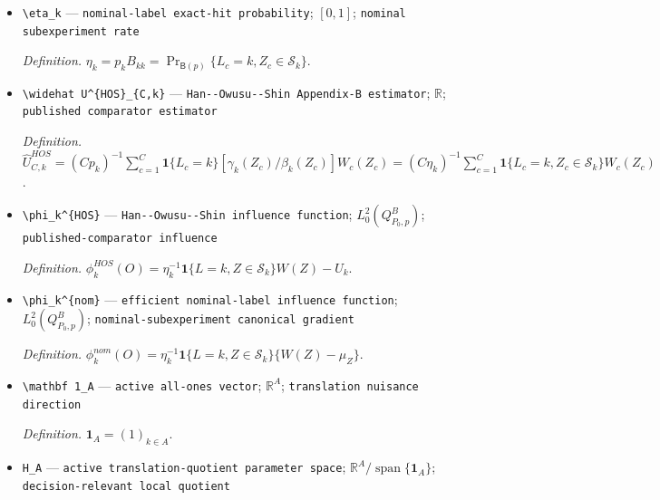 \documentclass{article}
\begin{document}
\begin{itemize}
  \par\smallskip\noindent\emph{Definition.} \(\beta_k(z)=\pi_k^{\sum_jz_j}(1-\pi_k)^{n-\sum_jz_j}\).
  \item \texttt{\textbackslash{}\allowbreak{}eta\_\allowbreak{}k} --- \texttt{nominal-\allowbreak{}label exact-\allowbreak{}hit probability}; \([0,1]\); \texttt{nominal subexperiment rate}
  \par\smallskip\noindent\emph{Definition.} \(\eta_k=p_kB_{kk}=\Pr_{\mathsf B(p)}\{L_c=k,Z_c\in\mathcal S_k\}\).
  \item \texttt{\textbackslash{}\allowbreak{}widehat U\textasciicircum{}\{HOS\}\allowbreak{}\_\allowbreak{}\{C,\allowbreak{}k\}\allowbreak{}} --- \texttt{Han-\allowbreak{}-\allowbreak{}Owusu-\allowbreak{}-\allowbreak{}Shin Appendix-\allowbreak{}B estimator}; \(\mathbb R\); \texttt{published comparator estimator}
  \par\smallskip\noindent\emph{Definition.} \(\widehat U^{HOS}_{C,k}=(Cp_k)^{-1}\sum_{c=1}^C\mathbf 1\{L_c=k\}[\gamma_k(Z_c)/\beta_k(Z_c)]W_c(Z_c)=(C\eta_k)^{-1}\sum_{c=1}^C\mathbf 1\{L_c=k,Z_c\in\mathcal S_k\}W_c(Z_c)\).
  \item \texttt{\textbackslash{}\allowbreak{}phi\_\allowbreak{}k\textasciicircum{}\{HOS\}\allowbreak{}} --- \texttt{Han-\allowbreak{}-\allowbreak{}Owusu-\allowbreak{}-\allowbreak{}Shin influence function}; \(L^2_0(Q^B_{P_0,p})\); \texttt{published-\allowbreak{}comparator influence}
  \par\smallskip\noindent\emph{Definition.} \(\phi_k^{HOS}(O)=\eta_k^{-1}\mathbf 1\{L=k,Z\in\mathcal S_k\}W(Z)-U_k\).
  \item \texttt{\textbackslash{}\allowbreak{}phi\_\allowbreak{}k\textasciicircum{}\{nom\}\allowbreak{}} --- \texttt{efficient nominal-\allowbreak{}label influence function}; \(L^2_0(Q^B_{P_0,p})\); \texttt{nominal-\allowbreak{}subexperiment canonical gradient}
  \par\smallskip\noindent\emph{Definition.} \(\phi_k^{nom}(O)=\eta_k^{-1}\mathbf 1\{L=k,Z\in\mathcal S_k\}\{W(Z)-\mu_Z\}\).
  \item \texttt{\textbackslash{}\allowbreak{}mathbf 1\_\allowbreak{}A} --- \texttt{active all-\allowbreak{}ones vector}; \(\mathbb R^A\); \texttt{translation nuisance direction}
  \par\smallskip\noindent\emph{Definition.} \(\mathbf 1_A=(1)_{k\in A}\).
  \item \texttt{H\_\allowbreak{}A} --- \texttt{active translation-\allowbreak{}quotient parameter space}; \(\mathbb R^A/\operatorname{span}\{\mathbf 1_A\}\); \texttt{decision-\allowbreak{}relevant local quotient}

\end{itemize}
\end{document}
